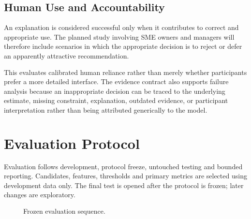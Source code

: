 \documentclass[a4paper,11pt,oneside]{book}
\theoremstyle{plain}
\theoremstyle{definition}
\theoremstyle{remark}
\begin{document}
\subsection{Human Use and Accountability}
\label{subsec:human_use_accountability}

An explanation is considered successful only when it contributes to correct and
appropriate use. The planned study involving SME owners and managers will therefore include
scenarios in which the
appropriate decision is to reject or defer an apparently attractive
recommendation.

This evaluates calibrated human reliance rather than merely whether participants
prefer a more detailed interface. The evidence contract also supports failure
analysis because an inappropriate decision can be traced to the underlying
estimate, missing constraint, explanation, outdated evidence, or participant
interpretation rather than being attributed generically to the model.


\section{Evaluation Protocol}
\label{sec:evaluation_protocol}
Evaluation follows development, protocol freeze, untouched testing and
bounded reporting. Candidates, features, thresholds and primary metrics
are selected using development data only. The final test is opened after
the protocol is frozen; later changes are exploratory.

\begin{figure}[H]
\centering
{}
\caption{Frozen evaluation sequence.}
\label{fig:evaluation_design}
\end{figure}
\end{document}
